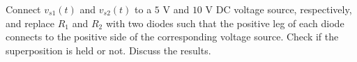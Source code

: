 \documentclass[11pt]{article}
\begin{document}
\begin{question}
    \begin{subquestion}{Connect $v_{s1}(t)$ and $v_{s2}(t)$ to a $5$ V and $10$ V DC voltage source, respectively, and replace $R_1$ and $R_2$ with two diodes such that the positive leg of each diode connects to the positive side of the corresponding voltage source. Check if the superposition is held or not. Discuss the results.}
\end{subquestion}
\end{question}
\end{document}
